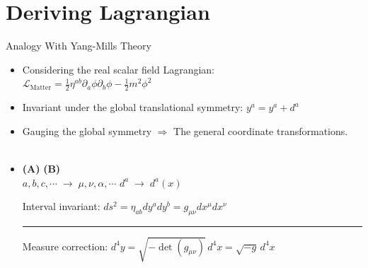 \documentclass[aspectratio=169,usenames,dvipsnames]{beamer}
\begin{document}
\section{\bf Deriving Lagrangian}
\begin{frame}{Analogy With Yang-Mills Theory} 
  \begin{itemize}
     \item[] Considering the real scalar field Lagrangian:\\[2mm]
    \centering $\mathcal{L}_{\text{Matter}}  = \frac{1}{2} \eta^{ab}
    \partial_a\phi \partial_b\phi - \frac{1}{2} m^2 \phi^2 $\\[7mm] \justifying
     \item[] Invariant under the global translational symmetry: \qquad $y^a = y^a + d^a $ \\[7mm]
     \item[] Gauging the global symmetry \; $\Rightarrow$ \; The general coordinate transformations.\\[2mm]
    \centering {}  \\[5mm]
     \item[] \hspace{19mm} \textbf{(A)}   \hspace{79mm} \textbf{(B)} \\[1mm]
     $ a,b,c,\cdots \;\rightarrow\;
    \mu,\nu,\alpha,\cdots$  \hfill  $ d^a \;\rightarrow\; d^a(x) $ \\[1mm]
    \raggedright\scriptsize{Interval invariant: $ds^2 = \eta_{ab} dy^a dy^b  =
      g_{\mu\nu} dx^{\mu} dx^{\nu}$}   \\[3mm]
    \textcolor{LUCopper}{\rule{\textwidth}{1pt}}
    \tiny{Measure correction: $d^4y=\sqrt{-\det(g_{\mu\nu})}\, d^4x=\sqrt{-g}\, d^4x$}\\[50mm]
  \end{itemize}
  \vspace{50mm}
\end{frame}
\end{document}
